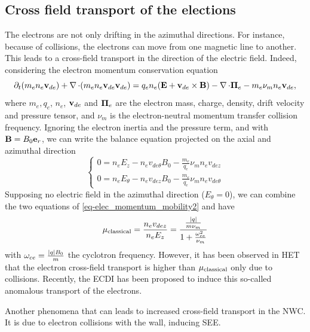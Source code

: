 \subsection{Cross field transport of the elections}
\label{sec-mob}
The electrons are not only drifting in the azimuthal directions.
For instance, because of collisions, the electrons can move from one magnetic line to another.
This leads to a cross-field transport in the direction of the electric field.
Indeed, considering the electron momentum conservation equation \citep{lafleur2016a}
\begin{equation} \label{eq-elec_momentum_mobility}
  \partial_t(m_e n_e {\mathbf v}_{de}) + \operatorname{{\mathbf \nabla}} \cdot (m_e n_e  {\mathbf v}_{de} {\mathbf v}_{de}) = q_e n_e ( {\mathbf E} + {\mathbf v}_{de} \times {\mathbf B}) - \operatorname{{\mathbf \nabla}} \cdot {\mathbf \Pi}_e - m_e \nu_m n_e {\mathbf v}_{de},
\end{equation}
where $m_e, q_e$, $n_e$, ${\mathbf v}_{de}$ and ${\mathbf \Pi}_e $ are the electron mass, charge, density, drift velocity and pressure tensor, and $\nu_m$ is the electron-neutral momentum transfer collision frequency.
Ignoring the electron inertia and the pressure term, and with ${\mathbf B} = B_0 {\mathbf e}_r$, we can write the balance equation projected on the axial and azimuthal direction
\begin{equation} \label{eq-elec_momentum_mobility2}
\begin{cases}
  0 =  n_e E_z - n_e v_{de{\theta}} B_0 - \frac{m_e}{q_e} \nu_m n_e v_{dez}\\
  0 =  n_e E_{\theta} -  n_e v_{dez} B_0 - \frac{m_e}{q_e} \nu_m n_e v_{de{\theta}}
\end{cases}
\end{equation}
Supposing no electric field in the azimuthal direction ($E_{\theta}=0$),  we can combine the two equations of \cref{eq-elec_momentum_mobility2} and have \citep{chen2006,meezan2001}
\begin{equation} \label{eq-mobility}
  \mu_{\mathrm{classical}} = \frac{n_e v_{dez}}{n_e E_z} = \frac{ \frac{\lvert q\rvert}{m \nu_m}}{1 + \frac{\omega_{ce}^2}{\nu_m}}
\end{equation}
with $\omega_{ce}= \frac{\lvert q\rvert B_0}{m}$ the cyclotron frequency.
However, it has been observed in \ac{HET} that the electron cross-field transport is higher than $\mu_{\mathrm{classical}}$ only due to collisions.
Recently, the \ac{ECDI} has been proposed to induce this so-called anomalous transport of the electrons.

Another phenomena that can leads to increased cross-field transport in the \ac{NWC}.
It is due to electron collisions with the wall, inducing \ac{SEE}.


